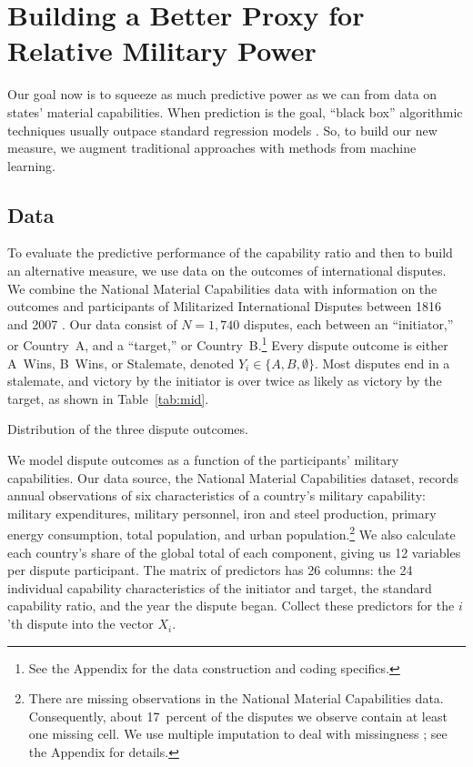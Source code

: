 
\section{Building a Better Proxy for Relative Military Power}
\label{sec:methods}

Our goal now is to squeeze as much predictive power as we can from data on states' material capabilities.
When prediction is the goal, ``black box'' algorithmic techniques usually outpace standard regression models \citep{Breiman:2001fd}.
So, to build our new measure, we augment traditional approaches with methods from machine learning.

\subsection{Data}

To evaluate the predictive performance of the capability ratio and then to build an alternative measure, we use data on the outcomes of international disputes.
We combine the National Material Capabilities data \citep{singer1972} with information on the outcomes and participants of Militarized International Disputes between 1816 and 2007 \citep{Palmer:2015hp}.
Our data consist of $N = 1{,}740$ disputes, each between an ``initiator,'' or Country~A, and a ``target,'' or Country~B.\footnote{%
  See the Appendix for the data construction and coding specifics.
}
Every dispute outcome is either A~Wins, B~Wins, or Stalemate, denoted $Y_i \in \{A, B, \emptyset\}$.
Most disputes end in a stalemate, and victory by the initiator is over twice as likely as victory by the target, as shown in Table~\ref{tab:mid}.

\begin{table}[htp]
  \centering
  
  \caption{
    Distribution of the three dispute outcomes.
  }
  \label{tab:mid}
\end{table}

We model dispute outcomes as a function of the participants' military capabilities.
Our data source, the National Material Capabilities dataset, records annual observations of six characteristics of a country's military capability: military expenditures, military personnel, iron and steel production, primary energy consumption, total population, and urban population.\footnote{%
  There are missing observations in the National Material Capabilities data.
  Consequently, about 17~percent of the disputes we observe contain at least one missing cell.
  We use multiple imputation to deal with missingness \citep{honaker_what_2010}; see the Appendix for details.
}
We also calculate each country's share of the global total of each component, giving us 12 variables per dispute participant.
The matrix of predictors has 26 columns: the 24 individual capability characteristics of the initiator and target, the standard capability ratio, and the year the dispute began.
Collect these predictors for the $i$'th dispute into the vector $X_i$.

